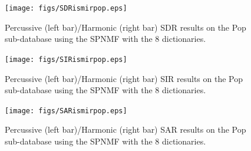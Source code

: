 \documentclass{article}
\begin{document}
\begin{figure}[h]

  \centering 
  \texttt{[image: figs/SDRismirpop.eps]}
  \caption{\label{sdrpop} Percussive (left bar)/Harmonic (right bar) SDR results on the Pop sub-database using the SPNMF with the 8 dictionaries.}
  
\end{figure}\begin{figure}[h]

  \centering 
  \texttt{[image: figs/SIRismirpop.eps]}
  \caption{\label{sirpop} Percussive (left bar)/Harmonic (right bar) SIR results on the Pop sub-database using the SPNMF with the 8 dictionaries.}
  
\end{figure}\begin{figure}[h]

  \centering 
  \texttt{[image: figs/SARismirpop.eps]}
  \caption{\label{sarpop} Percussive (left bar)/Harmonic (right bar) SAR results on the Pop sub-database using the SPNMF with the 8 dictionaries.}
  
\end{figure}

%   
\end{document}

